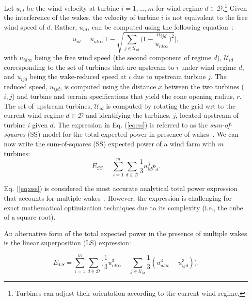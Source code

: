 \documentclass[preprint,12pt]{elsarticle}
\begin{document}
Let $u_{id}$ be the wind velocity at turbine $i = 1,\ldots, m$ for wind regime $d\in\mathcal{D}$.\footnote{Turbines can adjust their orientation according to the current wind 
regime.}  Given the interference of the wakes, the velocity of turbine $i$ is not equivalent to the free wind speed of $d$.
Rather, $u_{id}$, can be computed using the following equation~\cite{Zhang2014}:
\begin{equation}
u_{id} = u_{id\infty} \Bigg[1 - \sqrt{\sum_{j\in\mathcal{U}_{id}} \bigg( 1-\frac{u_{ijd}}{u_{id\infty}} \bigg)^2}  \Bigg], \label{eq:ss}
\end{equation} with $u_{id\infty}$ being the free wind speed (the second component of regime $d$), $\mathcal{U}_{id}$ corresponding to the set of turbines  that are upstream to $i$ 
under wind regime $d$, and $u_{ijd}$ being the wake-reduced speed at $i$ due to upstream turbine $j$. 
The reduced speed, $u_{ijd}$, is computed using the distance $x$ between the two turbines ($i,j$)  and turbine and terrain specifications that yield the cone opening radius, $r$. The set of upstream turbines, $\mathcal{U}_{id}$ is computed  
by rotating the grid wrt to the current wind regime $d \in \mathcal{D}$ and identifying the turbines, $j$, located upstream of turbine $i$ given $d$. The expression in Eq. (\ref{eq:ss}) is referred to as the \emph{sum-of-squares} (SS) model for 
the total expected power in presence of wakes~\cite{Zhang2014}.  We can now write 
the sum-of-squares (SS) expected power of a wind farm with $m$ turbines:
\begin{equation}
  E_{SS} = \sum_{i=1}^m \sum_{d\in\mathcal{D}} \frac{1}{3} u_{id}^3p_d.\label{eq:ess}
\end{equation}

  Eq. (\ref{eq:ess}) is considered the most accurate analytical total power expression that accounts for multiple wakes~\cite{jensen1983note}. 
  However, the expression is challenging for exact mathematical optimization techniques due to its complexity (i.e., the cube of a square root).

An alternative 
form of the total expected power in the presence of multiple wakes is the linear superposition (LS) expression:

\begin{equation} \label{eq:ls}
E_{LS} = \sum_{i=1}^m \sum_{d\in\mathcal{D}} \Bigg(\frac{1}{3}u_{id\infty}^3 -\sum_{j\in\mathcal{U}_{id}} \frac{1}{3}(u_{id\infty}^3 - u_{ijd}^3)\Bigg).
\end{equation}
\end{document}

